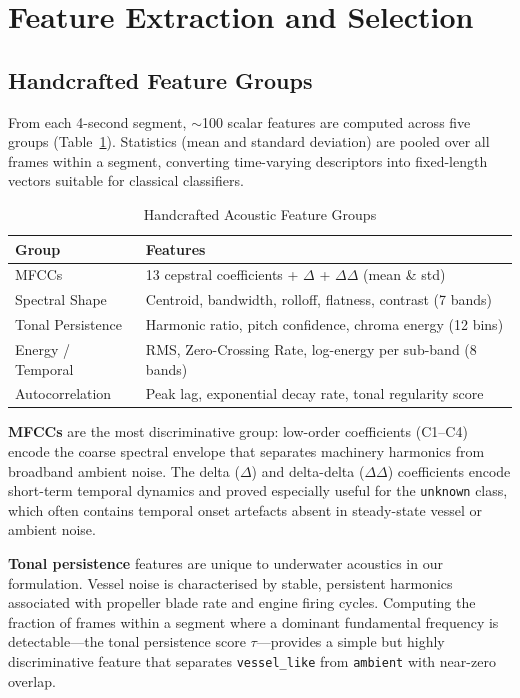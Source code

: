 \documentclass[conference]{IEEEtran}
\begin{document}
\section{Feature Extraction and Selection}
\label{sec:features}

\subsection{Handcrafted Feature Groups}

From each 4-second segment, $\sim$100 scalar features are computed across five groups (Table~\ref{tab:features}). Statistics (mean and standard deviation) are pooled over all frames within a segment, converting time-varying descriptors into fixed-length vectors suitable for classical classifiers.

\begin{table}[h]
\caption{Handcrafted Acoustic Feature Groups}
\label{tab:features}
\centering
\renewcommand{\arraystretch}{1.2}
\begin{tabular}{lp{5.0cm}}
\toprule
\textbf{Group} & \textbf{Features} \\
\midrule
MFCCs              & 13 cepstral coefficients + $\Delta$ + $\Delta\Delta$ (mean \& std) \\
Spectral Shape     & Centroid, bandwidth, rolloff, flatness, contrast (7 bands) \\
Tonal Persistence  & Harmonic ratio, pitch confidence, chroma energy (12 bins) \\
Energy / Temporal  & RMS, Zero-Crossing Rate, log-energy per sub-band (8 bands) \\
Autocorrelation    & Peak lag, exponential decay rate, tonal regularity score \\
\bottomrule
\end{tabular}
\end{table}

\textbf{MFCCs} are the most discriminative group: low-order coefficients (C1--C4) encode the coarse spectral envelope that separates machinery harmonics from broadband ambient noise. The delta ($\Delta$) and delta-delta ($\Delta\Delta$) coefficients encode short-term temporal dynamics and proved especially useful for the \texttt{unknown} class, which often contains temporal onset artefacts absent in steady-state vessel or ambient noise.

\textbf{Tonal persistence} features are unique to underwater acoustics in our formulation. Vessel noise is characterised by stable, persistent harmonics associated with propeller blade rate and engine firing cycles. Computing the fraction of frames within a segment where a dominant fundamental frequency is detectable---the tonal persistence score $\tau$---provides a simple but highly discriminative feature that separates \texttt{vessel\_like} from \texttt{ambient} with near-zero overlap.
\end{document}
